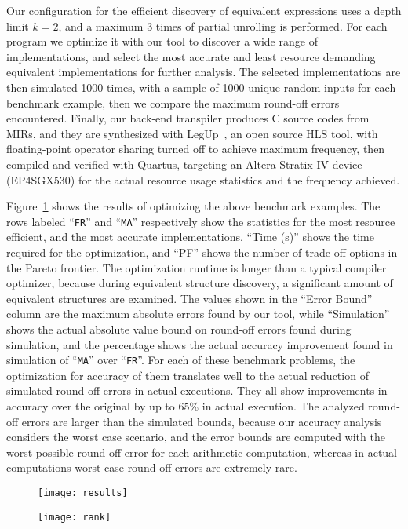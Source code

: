 Our configuration for the efficient discovery of equivalent expressions
uses a depth limit $k = 2$, and a maximum 3 times of partial unrolling is
performed.  For each program we optimize it with our tool to discover a wide
range of implementations, and select the most accurate and least resource
demanding equivalent implementations for further analysis.  The selected
implementations are then simulated 1000 times, with a sample of 1000 unique
random inputs for each benchmark example, then we compare the maximum round-off
errors encountered.  Finally, our back-end transpiler produces C source codes
from MIRs, and they are synthesized with LegUp~\cite{legup}, an open source
HLS tool, with floating-point operator sharing turned off to achieve maximum
frequency, then compiled and verified with Quartus, targeting an Altera
Stratix IV device (EP4SGX530) for the actual resource usage statistics and the
frequency achieved.

Figure~\ref{po:fig:results} shows the results of optimizing the above benchmark
examples.  The rows labeled ``\texttt{FR}'' and ``\texttt{MA}'' respectively
show the statistics for the most resource efficient, and the most accurate
implementations.  ``Time (s)'' shows the time required for the optimization,
and ``PF'' shows the number of trade-off options in the Pareto frontier.  The
optimization runtime is longer than a typical compiler optimizer, because
during equivalent structure discovery, a significant amount of equivalent
structures are examined.  The values shown in the ``Error Bound'' column are
the maximum absolute errors found by our tool, while ``Simulation'' shows the
actual absolute value bound on round-off errors found during simulation, and
the percentage shows the actual accuracy improvement found in simulation of
``\texttt{MA}'' over ``\texttt{FR}''.  For each of these benchmark problems,
the optimization for accuracy of them translates well to the actual reduction
of simulated round-off errors in actual executions.  They all show improvements
in accuracy over the original by up to 65\% in actual execution.  The analyzed
round-off errors are larger than the simulated bounds, because our accuracy
analysis considers the worst case scenario, and the error bounds are computed
with the worst possible round-off error for each arithmetic computation,
whereas in actual computations worst case round-off errors are extremely rare.

\begin{figure}[ht]
    \centering
    \texttt{[image: results]}
    \label{po:fig:results}
\end{figure}
\begin{figure}[ht]
    \centering
    \texttt{[image: rank]}
    \label{po:fig:rank}
\end{figure}

